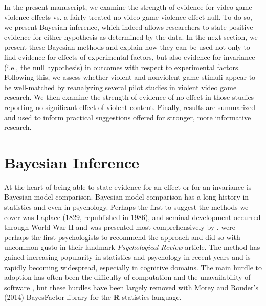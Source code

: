 \documentclass[man]{apa6}
\begin{document}
In the present manuscript, we examine the strength of evidence for video game violence effects vs. a fairly-treated no-video-game-violence effect null.  To do so, we present Bayesian inference, which indeed allows researchers to state positive evidence for either hypothesis as determined by the data.  In the next section, we present these Bayesian methods and explain how they can be used not only to find evidence for effects of experimental factors, but also evidence for invariance (i.e., the null hypothesis) in outcomes with respect to experimental factors. Following this, we assess whether violent and nonviolent game stimuli appear to be well-matched by reanalyzing several pilot studies in violent video game research.  We then examine the strength of evidence of no effect in those studies reporting no significant effect of violent content.  Finally, results are summarized and used to inform practical suggestions offered for stronger, more informative research. 

\section{Bayesian Inference}
At the heart of being able to state evidence for an effect or for an invariance is Bayesian model comparison.  Bayesian model comparison has a long history in statistics and even in psychology.  Perhaps the first to suggest the methods we cover was Laplace (1829, republished in 1986), and seminal development occurred through World War II %
and was presented most comprehensively by \citet{Jeffreys:1961}.  \citet{Edwards:etal:1963} were perhaps the first psychologists to recommend the approach and did so with uncommon gusto in their landmark {\em Psychological Review} article.  The method has gained increasing popularity in statistics and psychology in recent years \citep{Berger:Delampady:1987,Gallistel:2009,Raftery:1995,Rouder:etal:2009a,Wagenmakers:2007} and is rapidly becoming widespread, especially in cognitive domains. %
The main hurdle to adoption has often been the difficulty of computation and the unavailability of software \citep{Gallistel:2009}, but these hurdles have been largely removed with Morey and Rouder's (2014) BayesFactor library for the {\bf R} statistics language.

\nocite{Laplace:1986,Morey:Rouder:2014}
\end{document}
